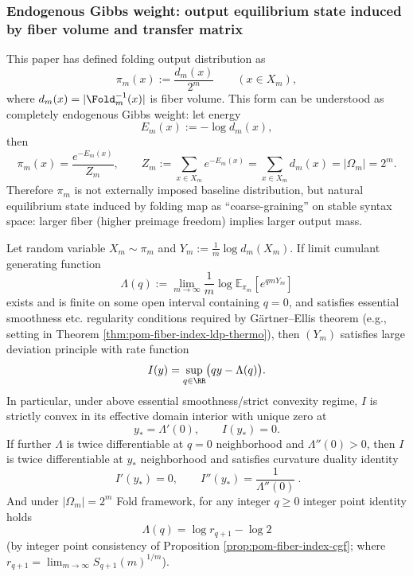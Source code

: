 \subsubsection{Endogenous Gibbs weight: output equilibrium state induced by fiber volume and transfer matrix}\label{subsubsec:pom-gibbs-pi}
This paper has defined folding output distribution as
\[
\pi_m(x):=\frac{d_m(x)}{2^m}\qquad(x\in X_m),
\]
where \(d_m(x)=|\Fold_m^{-1}(x)|\) is fiber volume.
This form can be understood as completely endogenous Gibbs weight: let energy
\[
E_m(x):=-\log d_m(x),
\]
then
\[
\pi_m(x)=\frac{e^{-E_m(x)}}{Z_m},
\qquad
Z_m:=\sum_{x\in X_m}e^{-E_m(x)}=\sum_{x\in X_m}d_m(x)=|\Omega_m|=2^m.
\]
Therefore \(\pi_m\) is not externally imposed baseline distribution, but natural equilibrium state induced by folding map as ``coarse-graining'' on stable syntax space: larger fiber (higher preimage freedom) implies larger output mass.
\par

\begin{proposition}\label{prop:pom-fiber-index-ldp-from-collision-spectrum}
Let random variable \(X_m\sim\pi_m\) and \(Y_m:=\frac{1}{m}\log d_m(X_m)\).
If limit cumulant generating function
\[
\Lambda(q):=\lim_{m\to\infty}\frac{1}{m}\log\mathbb{E}_{\pi_m}\!\left[e^{qmY_m}\right]
\]
exists and is finite on some open interval containing \(q=0\), and satisfies essential smoothness etc. regularity conditions required by Gärtner--Ellis theorem (e.g., setting in Theorem \ref{thm:pom-fiber-index-ldp-thermo}), then \((Y_m)\) satisfies large deviation principle with rate function
\[
I(y)=\sup_{q\in\RR}\bigl(qy-\Lambda(q)\bigr).
\]
In particular, under above essential smoothness/strict convexity regime, \(I\) is strictly convex in its effective domain interior with unique zero at
\[
y_\ast=\Lambda'(0),\qquad I(y_\ast)=0.
\]
If further \(\Lambda\) is twice differentiable at \(q=0\) neighborhood and \(\Lambda''(0)>0\), then \(I\) is twice differentiable at \(y_\ast\) neighborhood and satisfies curvature duality identity
\[
\boxed{\ I'(y_\ast)=0,\qquad I''(y_\ast)=\frac{1}{\Lambda''(0)}\ }.
\]
And under \(|\Omega_m|=2^m\) Fold framework, for any integer \(q\ge 0\) integer point identity holds
\[
\boxed{\ \Lambda(q)=\log r_{q+1}-\log 2\ }
\]
(by integer point consistency of Proposition \ref{prop:pom-fiber-index-cgf}; where \(r_{q+1}=\lim_{m\to\infty}S_{q+1}(m)^{1/m}\)).
\end{proposition}

